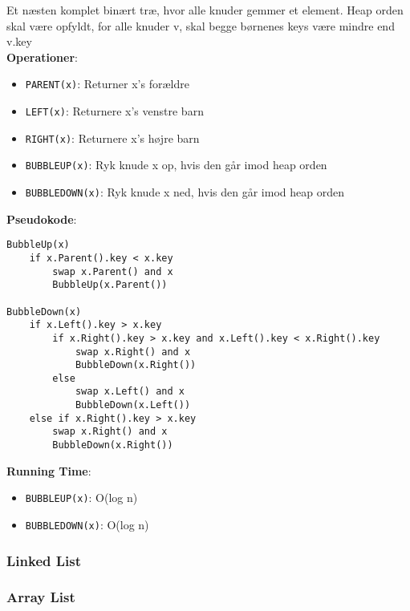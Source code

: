 Et næsten komplet binært træ, hvor alle knuder gemmer et element. Heap orden skal være opfyldt, for alle knuder v, skal begge børnenes keys være mindre end v.key\\
\textbf{Operationer}:
\begin{itemize}
	\item \texttt{PARENT(x)}: Returner x's forældre
	\item \texttt{LEFT(x)}: Returnere x's venstre barn
	\item \texttt{RIGHT(x)}: Returnere x's højre barn
	\item \texttt{BUBBLEUP(x)}: Ryk knude x op, hvis den går imod heap orden
	\item \texttt{BUBBLEDOWN(x)}: Ryk knude x ned, hvis den går imod heap orden
\end{itemize}
\textbf{Pseudokode}:
\begin{lstlisting}[frame=single, mathescape=true]
BubbleUp(x)
	if x.Parent().key < x.key
		swap x.Parent() and x
		BubbleUp(x.Parent())

BubbleDown(x)
	if x.Left().key > x.key
		if x.Right().key > x.key and x.Left().key < x.Right().key
			swap x.Right() and x
			BubbleDown(x.Right())
		else 
			swap x.Left() and x
			BubbleDown(x.Left())
	else if x.Right().key > x.key
		swap x.Right() and x
		BubbleDown(x.Right())
\end{lstlisting}
\textbf{Running Time}:
\begin{itemize}
	\item \texttt{BUBBLEUP(x)}: O(log n)
	\item \texttt{BUBBLEDOWN(x)}: O(log n)
\end{itemize}
\newpage

\subsubsection{Linked List}


\subsubsection{Array List}
